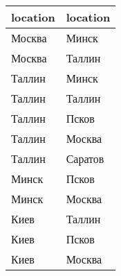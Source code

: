\begin{tabular}{ll}
\toprule
location & location \\
\midrule
Москва & Минск \\
Москва & Таллин \\
Таллин & Минск \\
Таллин & Таллин \\
Таллин & Псков \\
Таллин & Москва \\
Таллин & Саратов \\
Минск & Псков \\
Минск & Москва \\
Киев & Таллин \\
Киев & Псков \\
Киев & Москва \\
\bottomrule
\end{tabular}
